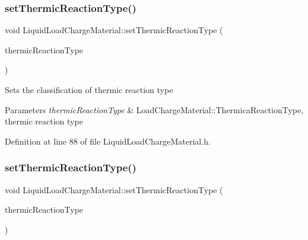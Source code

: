 \subsubsection{\texorpdfstring{set\+Thermic\+Reaction\+Type()}{setThermicReactionType()}\hspace{0.1cm}{\footnotesize\ttfamily [2/3]}}
{\footnotesize\ttfamily void Liquid\+Load\+Charge\+Material\+::set\+Thermic\+Reaction\+Type (\begin{DoxyParamCaption}\item[{\hyperlink{class_load_charge_material_a51d4263e865a5d86236622dd3fe23fd1}{Load\+Charge\+Material\+::\+Thermic\+Reaction\+Type}}]{thermic\+Reaction\+Type }\end{DoxyParamCaption})\hspace{0.3cm}{\ttfamily [inline]}}

Sets the classification of thermic reaction type 
\begin{DoxyParams}{Parameters}
{\em thermic\+Reaction\+Type} & Load\+Charge\+Material\+::\+Thermica\+Reaction\+Type, thermic reaction type \\
\hline
\end{DoxyParams}


Definition at line 88 of file Liquid\+Load\+Charge\+Material.\+h.

\mbox{\label{class_liquid_load_charge_material_a39c258d0bfdcfa352590d411a8c4e882}} 
\subsubsection{\texorpdfstring{set\+Thermic\+Reaction\+Type()}{setThermicReactionType()}\hspace{0.1cm}{\footnotesize\ttfamily [3/3]}}
{\footnotesize\ttfamily void Liquid\+Load\+Charge\+Material\+::set\+Thermic\+Reaction\+Type (\begin{DoxyParamCaption}\item[{\hyperlink{class_load_charge_material_a51d4263e865a5d86236622dd3fe23fd1}{Load\+Charge\+Material\+::\+Thermic\+Reaction\+Type}}]{thermic\+Reaction\+Type }\end{DoxyParamCaption})\hspace{0.3cm}{\ttfamily [inline]}}

